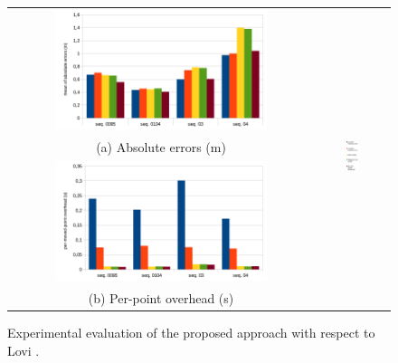 \begin{figure}[t]
\centering
  \begin{tabular}{cc}
    \centering
    \includegraphics[width=0.72\textwidth]{./img/results.pdf}&
    \multirow{4}{*}{\includegraphics[width=0.2\textwidth]{./img/legenda}}\\
    (a) Absolute errors (m)\\
    \includegraphics[width=0.72\textwidth]{./img/resultsTiming.pdf}\\
    (b) Per-point overhead (s)\\
  \end{tabular}
  \caption{Experimental evaluation of the proposed approach with respect to Lovi \etal \cite{lovi_et_al_11}.}
   \label{tab:results}
\end{figure}


